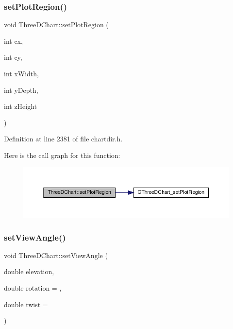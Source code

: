 \subsubsection{\texorpdfstring{set\+Plot\+Region()}{setPlotRegion()}}
{\footnotesize\ttfamily void Three\+D\+Chart\+::set\+Plot\+Region (\begin{DoxyParamCaption}\item[{int}]{cx,  }\item[{int}]{cy,  }\item[{int}]{x\+Width,  }\item[{int}]{y\+Depth,  }\item[{int}]{z\+Height }\end{DoxyParamCaption})\hspace{0.3cm}{\ttfamily [inline]}}



Definition at line 2381 of file chartdir.\+h.

Here is the call graph for this function\+:
\nopagebreak
\begin{figure}[H]
\begin{center}
\leavevmode
\includegraphics[width=350pt]{class_three_d_chart_a5c462fd933130bfb21c0d0b09af6f281_cgraph}
\end{center}
\end{figure}
\mbox{\label{class_three_d_chart_a04d610c665d0c550865e89ad5036a660}} 
\subsubsection{\texorpdfstring{set\+View\+Angle()}{setViewAngle()}}
{\footnotesize\ttfamily void Three\+D\+Chart\+::set\+View\+Angle (\begin{DoxyParamCaption}\item[{double}]{elevation,  }\item[{double}]{rotation = {},  }\item[{double}]{twist = {} }\end{DoxyParamCaption})\hspace{0.3cm}{\ttfamily [inline]}}



